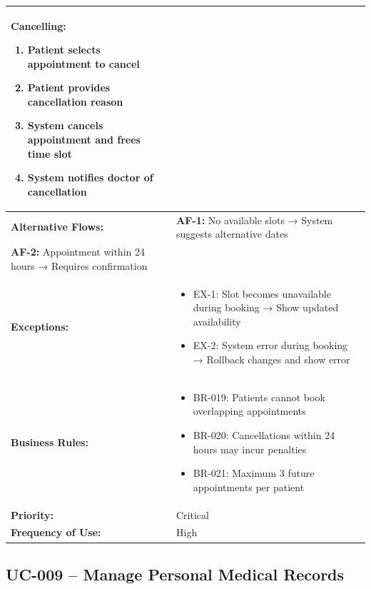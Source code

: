 \documentclass[12pt,a4paper]{article}
\begin{document}
\begin{longtable}{|p{4.5cm}|p{10.5cm}|}
\begin{enumerate}
\end{enumerate}
\textbf{Cancelling:}
\begin{enumerate}
  \item Patient selects appointment to cancel
  \item Patient provides cancellation reason
  \item System cancels appointment and frees time slot
  \item System notifies doctor of cancellation
\end{enumerate} \\
\hline
\textbf{Alternative Flows:} &
\textbf{AF-1:} No available slots → System suggests alternative dates \\
\textbf{AF-2:} Appointment within 24 hours → Requires confirmation \\
\hline
\textbf{Exceptions:} &
\begin{itemize}
  \item EX-1: Slot becomes unavailable during booking → Show updated availability
  \item EX-2: System error during booking → Rollback changes and show error
\end{itemize} \\
\hline
\textbf{Business Rules:} &
\begin{itemize}
  \item BR-019: Patients cannot book overlapping appointments
  \item BR-020: Cancellations within 24 hours may incur penalties
  \item BR-021: Maximum 3 future appointments per patient
\end{itemize} \\
\hline
\textbf{Priority:} & Critical \\
\hline
\textbf{Frequency of Use:} & High \\
\hline
\end{longtable}

\subsection{UC-009 – Manage Personal Medical Records}
\end{document}
